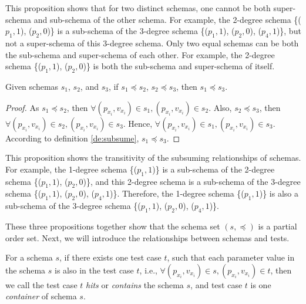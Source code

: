 This proposition shows that for two distinct schemas, one cannot be both super-schema and sub-schema of the other schema. For example, the 2-degree schema \{($p_{1}, 1$), ($p_{2}, 0$)\} is a sub-schema of the 3-degree schema \{($p_{1}, 1$), ($p_{2}, 0$), ($p_{4}, 1$)\}, but not a super-schema of this 3-degree schema.  Only two equal schemas can be both the sub-schema and super-schema of each other. For example, the 2-degree schema \{($p_{1}, 1$), ($p_{2}, 0$)\} is both the sub-schema and super-schema of itself.

\begin{proposition}[Transitive]\label{pro:subsumetrans}
Given schemas $s_{1}$, $s_{2}$, and $s_{3}$, if $s_{1} \preceq s_{2}$, $s_{2} \preceq s_{3}$, then $s_{1} \preceq s_{3}$.
\end{proposition}

\begin{proof}
As $s_{1} \preceq s_{2}$, then $\forall (p_{x_{i}}, v_{x_{i}})\in s_{1}, (p_{x_{i}}, v_{x_{i}}) \in s_{2}$. Also, $s_{2} \preceq s_{3}$, then $\forall (p_{x_{i}}, v_{x_{i}})\in s_{2}, (p_{x_{i}}, v_{x_{i}}) \in s_{3}$. Hence, $\forall (p_{x_{i}}, v_{x_{i}})\in s_{1}, (p_{x_{i}}, v_{x_{i}}) \in s_{3}$. According to definition \ref{de:subsume}, $s_{1} \preceq s_{3}$.
\end{proof}

This proposition shows the transitivity of the subsuming relationships of schemas. For example, the 1-degree schema \{($p_{1}, 1$)\} is a sub-schema of the 2-degree schema \{($p_{1}, 1$), ($p_{2}, 0$)\}, and this 2-degree schema is a sub-schema of the 3-degree schema \{($p_{1}, 1$), ($p_{2}, 0$), ($p_{4}, 1$)\}. Therefore, the 1-degree schema \{($p_{1}, 1$)\} is also a sub-schema of the 3-degree schema \{($p_{1}, 1$), ($p_{2}, 0$), ($p_{4}, 1$)\}.


These three propositions together show that the schema set $(s, \preceq)$ is a partial order set. Next, we will introduce the relationships between schemas and tests.

\begin{definition}\label{de:containorhit}
For a schema $s$, if there exists one test case $t$, such that each parameter value in the schema $s$ is also in the test case $t$, i.e., $\forall (p_{x_{i}}, v_{x_{i}}) \in s, (p_{x_{i}}, v_{x_{i}}) \in t$, then we call the test case $t$ \emph{hits} or \emph{contains} the schema $s$, and test case $t$ is one \emph{container} of schema $s$.
\end{definition}

